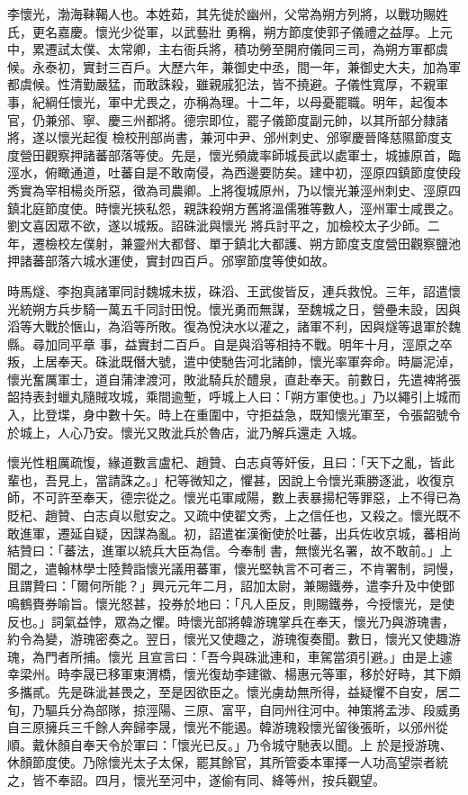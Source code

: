 \begin{pinyinscope}
 李懷光，渤海靺鞨人也。本姓茹，其先徙於幽州，父常為朔方列將，以戰功賜姓氏，更名嘉慶。懷光少從軍，以武藝壯
 勇稱，朔方節度使郭子儀禮之益厚。上元中，累遷試太僕、太常卿，主右衙兵將，積功勞至開府儀同三司，為朔方軍都虞候。永泰初，實封三百戶。大歷六年，兼御史中丞，間一年，兼御史大夫，加為軍都虞候。性清勤嚴猛，而敢誅殺，雖親戚犯法，皆不撓避。子儀性寬厚，不親軍事，紀綱任懷光，軍中尤畏之，亦稱為理。十二年，以母憂罷職。明年，起復本官，仍兼邠、寧、慶三州都將。德宗即位，罷子儀節度副元帥，以其所部分隸諸將，遂以懷光起復
 檢校刑部尚書，兼河中尹、邠州刺史、邠寧慶晉降慈隰節度支度營田觀察押諸蕃部落等使。先是，懷光頻歲率師城長武以處軍士，城據原首，臨涇水，俯瞰通道，吐蕃自是不敢南侵，為西邊要防矣。建中初，涇原四鎮節度使段秀實為宰相楊炎所惡，徵為司農卿。上將復城原州，乃以懷光兼涇州刺史、涇原四鎮北庭節度使。時懷光挾私怨，親誅殺朔方舊將溫儒雅等數人，涇州軍士咸畏之。劉文喜因眾不欲，遂以城叛。詔硃泚與懷光
 將兵討平之，加檢校太子少師。二年，遷檢校左僕射，兼靈州大都督、單于鎮北大都護、朔方節度支度營田觀察鹽池押諸蕃部落六城水運使，實封四百戶。邠寧節度等使如故。



 時馬燧、李抱真諸軍同討魏城未拔，硃滔、王武俊皆反，連兵救悅。三年，詔遣懷光統朔方兵步騎一萬五千同討田悅。懷光勇而無謀，至魏城之日，營壘未設，因與滔等大戰於愜山，為滔等所敗。復為悅決水以灌之，諸軍不利，因與燧等退軍於魏縣。尋加同平章
 事，益實封二百戶。自是與滔等相持不戰。明年十月，涇原之卒叛，上居奉天。硃泚既僭大號，遣中使馳告河北諸帥，懷光率軍奔命。時屬泥淖，懷光奮厲軍士，道自蒲津渡河，敗泚騎兵於醴泉，直赴奉天。前數日，先遣裨將張韶持表封蠟丸隨賊攻城，乘間逾塹，呼城上人曰：「朔方軍使也。」乃以繩引上城而入，比登堞，身中數十矢。時上在重圍中，守拒益急，既知懷光軍至，令張韶號令於城上，人心乃安。懷光又敗泚兵於魯店，泚乃解兵還走
 入城。



 懷光性粗厲疏愎，緣道數言盧杞、趙贊、白志貞等奸佞，且曰：「天下之亂，皆此輩也，吾見上，當請誅之。」杞等微知之，懼甚，因說上令懷光乘勝逐泚，收復京師，不可許至奉天，德宗從之。懷光屯軍咸陽，數上表暴揚杞等罪惡，上不得已為貶杞、趙贊、白志貞以慰安之。又疏中使翟文秀，上之信任也，又殺之。懷光既不敢進軍，遷延自疑，因謀為亂。初，詔遣崔漢衡使於吐蕃，出兵佐收京城，蕃相尚結贊曰：「蕃法，進軍以統兵大臣為信。今奉制
 書，無懷光名署，故不敢前。」上聞之，遣翰林學士陸贄詣懷光議用蕃軍，懷光堅執言不可者三，不肯署制，詞慢，且謂贄曰：「爾何所能？」興元元年二月，詔加太尉，兼賜鐵券，遣李升及中使鄧鳴鶴賚券喻旨。懷光怒甚，投券於地曰：「凡人臣反，則賜鐵券，今授懷光，是使反也。」詞氣益悖，眾為之懼。時懷光部將韓游瑰掌兵在奉天，懷光乃與游瑰書，約令為變，游瑰密奏之。翌日，懷光又使趣之，游瑰復奏聞。數日，懷光又使趣游瑰，為門者所捕。懷光
 且宣言曰：「吾今與硃泚連和，車駕當須引避。」由是上遽幸梁州。時李晟已移軍東渭橋，懷光復劫李建徽、楊惠元等軍，移於好畤，其下頗多攜貳。先是硃泚甚畏之，至是因欲臣之。懷光虜劫無所得，益疑懼不自安，居二旬，乃驅兵分為部隊，掠涇陽、三原、富平，自同州往河中。神策將孟涉、段威勇自三原擁兵三千餘人奔歸李晟，懷光不能遏。韓游瑰殺懷光留後張昕，以邠州從順。戴休顏自奉天令於軍曰：「懷光已反。」乃令城守馳表以聞。上
 於是授游瑰、休顏節度使。乃除懷光太子太保，罷其餘官，其所管委本軍擇一人功高望崇者統之，皆不奉詔。四月，懷光至河中，遂偷有同、絳等州，按兵觀望。




\end{pinyinscope}
